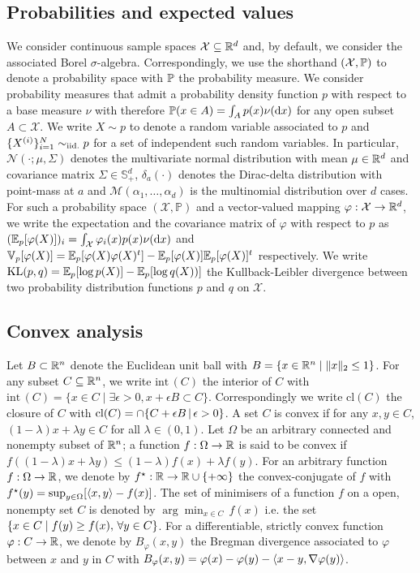 \subsection*{Probabilities and expected values}
We consider continuous sample spaces $\mathcal X\subseteq \R^{d}$ and, by default, we consider the associated Borel $\sigma$-algebra. 
Correspondingly, we use the shorthand $(\mathcal X,\P)$ to denote a probability space with $\P$ the probability measure. 
We consider probability measures that admit a probability density function $p$ with respect to a base measure $\nu$ with therefore $\P(x\in A)=\int_{A}p(x)\nudx$ for any open subset $A\subset \mathcal X$. We write $X\sim p$ to denote a random variable associated to $p$ and $\{X^{(i)}\}_{i=1}^{N}\simiid p$ for a set of independent such random variables.
In particular, $\mathcal N(\cdot; \mu,\Sigma)$ denotes the multivariate normal distribution with mean $\mu\in \R^{d}$ and covariance matrix $\Sigma\in\mathbb S^{d}_+$, $\delta_a(\cdot)$ denotes the Dirac-delta distribution with point-mass at $a$ and $\mathcal M(\alpha_{1},\dots,\alpha_{d})$ is the multinomial distribution over $d$ cases.
For such a probability space $(\mathcal X, \mathbb P)$ and a vector-valued mapping $\varphi:\mathcal X\to\R^{d}$, we write the expectation and the covariance matrix of $\varphi$ with respect to $p$ as $(\E_{p}[\varphi(X)])_{i}=\int_{\mathcal X}\varphi_{i}(x)p(x)\nudx$ and $\V_{p}[\varphi(X)]=\E_{p}[\varphi(X)\varphi(X)^{t}]-\E_{p}[\varphi(X)]\E_{p}[\varphi(X)]^{t}$ respectively. 
We write $\KL{p,q}=\E_{p}[\log p(X)]-\E_{p}[\log q(X))]$ the Kullback-Leibler divergence between two probability distribution functions $p$ and $q$ on $\mathcal X$. 
%

\subsection*{Convex analysis}
Let $B\subset\R^{n}$ denote the Euclidean unit ball with $B=\{x\in\R^{n}\mid \|x\|_{2}\le 1\}$. For any subset $C\subseteq\R^{n}$, we write $\mathrm{int}\,(C)$ the interior of $C$ with $\mathrm{int}\,(C)=\{x\in C \mid \exists \epsilon>0, x+\epsilon B \subset C\}$. Correspondingly we write $\mathrm{cl}(C)$ the closure of $C$ with $\mathrm{cl}(C) = \cap\{C+\epsilon B\st \epsilon>0\}$. A set $C$ is convex if for any $x,y\in C$, $(1-\lambda)x+\lambda y\in C$ for all $\lambda\in(0,1)$. Let $\Omega$ be an arbitrary connected and nonempty subset of $\R^{n}$; a function $f:\Omega\to\R$ is said to be convex if $f((1-\lambda)x+\lambda y)\le (1-\lambda)f(x)+\lambda f(y)$. For an arbitrary function $f:\Omega\to\R$, we denote by $f^{\star}:\R\to \R\cup\{+\infty\}$ the convex-conjugate of $f$ with $f^{\star}(y)=\sup_{y\in \Omega}[\scal{x,y}-f(x)]$. The set of minimisers of a function $f$ on a open, nonempty set $C$ is denoted by $\arg\min_{x\in C}\,f(x)$ i.e. the set $\pab{x\in C\mid f(y)\ge f(x), \,\forall y\in C}$. For a differentiable, strictly convex function $\varphi:C\to\R$, we denote by $B_\varphi(x,y)$ the Bregman divergence associated to $\varphi$ between $x$ and $y$ in $C$ with $B_\varphi(x,y)=\varphi(x)-\varphi(y)-\scal{x-y,\nabla \varphi(y)}$.  

